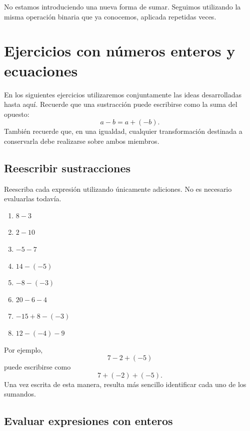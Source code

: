 No estamos introduciendo una nueva forma de sumar. Seguimos utilizando la misma operación binaria que ya conocemos, aplicada repetidas veces.

\section[Práctica con enteros y ecuaciones]{Ejercicios con números enteros y ecuaciones}

En los siguientes ejercicios utilizaremos conjuntamente las ideas desarrolladas hasta aquí. Recuerde que una sustracción puede escribirse como la suma del opuesto:
\[
a-b=a+(-b).
\]
También recuerde que, en una igualdad, cualquier transformación destinada a conservarla debe realizarse sobre ambos miembros.

\subsection*{Reescribir sustracciones}

Reescriba cada expresión utilizando únicamente adiciones. No es necesario evaluarlas todavía.
\begin{enumerate}
\item \(8-3\)

\item \(2-10\)

\item \(-5-7\)

\item \(14-(-5)\)

\item \(-8-(-3)\)

\item \(20-6-4\)

\item \(-15+8-(-3)\)

\item \(12-(-4)-9\)
\end{enumerate}
Por ejemplo,
\[
7-2+(-5)
\]
puede escribirse como
\[
7+(-2)+(-5).
\]
Una vez escrita de esta manera, resulta más sencillo identificar cada uno de los sumandos.

\subsection*{Evaluar expresiones con enteros}


